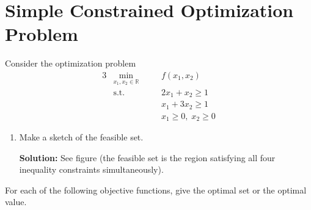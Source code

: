 \documentclass[10pt]{article}
\newcommand{\RR}{\mathbb{R}}
\begin{document}
\section{Simple Constrained Optimization Problem}

Consider the optimization problem
\begin{alignat}{3}
    &\min_{x_1, x_2 \in \RR} &\quad& f(x_1, x_2) \\
    &\text{s.t.} && 2x_1 + x_2 \geq 1 \\
    &&& x_1 + 3x_2 \geq 1 \\
    &&& x_1 \geq 0,\; x_2 \geq 0
\end{alignat}

\begin{enumerate}[label=(\alph*)]
    \item Make a sketch of the feasible set.

    \textbf{Solution:} See figure (the feasible set is the region satisfying all four inequality constraints simultaneously).
\end{enumerate}

For each of the following objective functions, give the optimal set or the optimal value.
\end{document}
